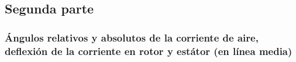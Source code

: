 \documentclass{report}
\begin{document}
\subsection{Segunda parte}
\subsubsection{Ángulos relativos y absolutos de la corriente de aire, deflexión de la corriente en rotor y estátor (en línea media)}










\end{document}
